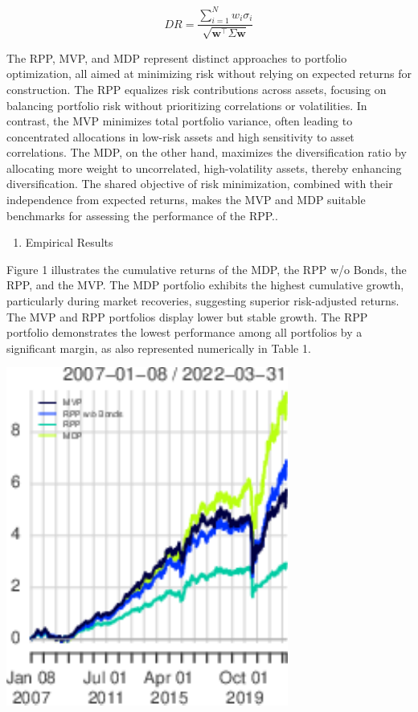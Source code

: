 \documentclass[11pt,preprint]{elsarticle}
\let\origfigure\figure
\let\endorigfigure\endfigure
\renewenvironment{figure}[1][2] {
    \expandafter\origfigure\expandafter[H]
} {
    \endorigfigure
}
\numberwithin{equation}{section}
\numberwithin{figure}{section}
\numberwithin{table}{section}
\def\tightlist{} %
\begin{document}
\begin{equation}
{DR} = \frac{\sum_{i=1}^{N} w_i \sigma_i}{\sqrt{\mathbf{w}^\top \Sigma \mathbf{w}}}
\end{equation}

The RPP, MVP, and MDP represent distinct approaches to portfolio
optimization, all aimed at minimizing risk without relying on expected
returns for construction. The RPP equalizes risk contributions across
assets, focusing on balancing portfolio risk without prioritizing
correlations or volatilities. In contrast, the MVP minimizes total
portfolio variance, often leading to concentrated allocations in
low-risk assets and high sensitivity to asset correlations. The MDP, on
the other hand, maximizes the diversification ratio by allocating more
weight to uncorrelated, high-volatility assets, thereby enhancing
diversification. The shared objective of risk minimization, combined
with their independence from expected returns, makes the MVP and MDP
suitable benchmarks for assessing the performance of the RPP..

\begin{enumerate}
\def\labelenumi{\arabic{enumi}.}
\setcounter{enumi}{4}
\tightlist
\item
  Empirical Results
\end{enumerate}

Figure 1 illustrates the cumulative returns of the MDP, the RPP w/o
Bonds, the RPP, and the MVP. The MDP portfolio exhibits the highest
cumulative growth, particularly during market recoveries, suggesting
superior risk-adjusted returns. The MVP and RPP portfolios display lower
but stable growth. The RPP portfolio demonstrates the lowest performance
among all portfolios by a significant margin, as also represented
numerically in Table 1.

\begin{figure}[H]

{\centering \includegraphics{Essay_files/figure-latex/Figure1-1} 

}

\caption{Cumulative returns over the whole portfolio runtime \label{Figure1}}\label{fig:Figure1}
\end{figure}
\end{document}
